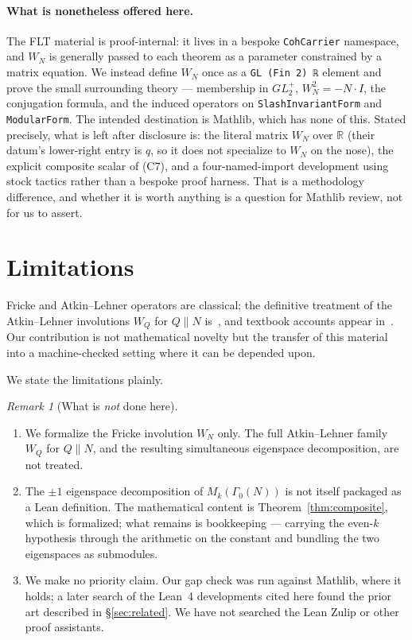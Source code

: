 \documentclass[11pt, a4paper]{article}
\newcommand{\lean}[1]{\ifmmode\text{\ttfamily\detokenize{#1}}\else{\ttfamily\detokenize{#1}}\fi}
\theoremstyle{remark}
\newtheorem{remark}[theorem]{Remark}
\begin{document}
\paragraph{What is nonetheless offered here.}
The FLT material is proof-internal: it lives in a bespoke \texttt{CohCarrier} namespace, and
$W_N$ is generally passed to each theorem as a parameter constrained by a matrix equation. We
instead define $W_N$ once as a \texttt{GL (Fin 2) ℝ} element and prove the small surrounding
theory --- membership in $GL_2^+$, $W_N^2 = -N\cdot I$, the conjugation formula, and the induced
operators on \texttt{SlashInvariantForm} and \texttt{ModularForm}. The intended destination is
Mathlib, which has none of this. Stated precisely, what is left after disclosure is: the literal
matrix $W_N$ over $\mathbb{R}$ (their datum's lower-right entry is $q$, so it does not specialize
to $W_N$ on the nose), the explicit composite scalar of (C7), and a four-named-import development
using stock tactics rather than a bespoke proof harness. That is a methodology difference, and
whether it is worth anything is a question for Mathlib review, not for us to assert.

\section{Limitations}

Fricke and Atkin--Lehner operators are classical; the definitive treatment of the
Atkin--Lehner involutions $W_Q$ for $Q \| N$ is~\cite{AtkinLehner1970}, and textbook
accounts appear in~\cite{DiamondShurman2005, Miyake2006, Ono2004}. Our contribution is not
mathematical novelty but the transfer of this material into a machine-checked setting where
it can be depended upon.

We state the limitations plainly.

\begin{remark}[What is \emph{not} done here]
\leavevmode
\begin{enumerate}[label=(\alph*)]
  \item We formalize the Fricke involution $W_N$ only. The full Atkin--Lehner family $W_Q$
        for $Q \| N$, and the resulting simultaneous eigenspace decomposition, are not
        treated.
  \item The $\pm 1$ eigenspace decomposition of $M_k(\Gamma_0(N))$ is not itself packaged as a
        Lean definition. The mathematical content is Theorem~\ref{thm:composite}, which is
        formalized; what remains is bookkeeping --- carrying the even-$k$ hypothesis through the
        \lean{zpow} arithmetic on the constant and bundling the two eigenspaces as submodules.
  \item We make no priority claim. Our gap check was run against Mathlib, where it holds; a
        later search of the Lean~4 developments cited here found the prior art described in
        \S\ref{sec:related}. We have not searched the Lean Zulip or other proof assistants.
\end{enumerate}
\end{remark}
\end{document}
